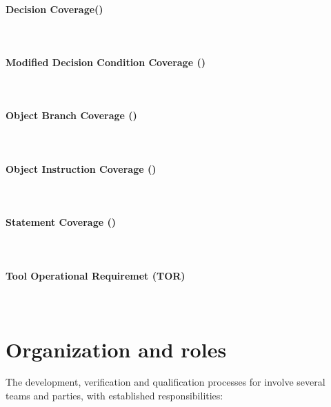\paragraph*{Decision Coverage(\dc)} \ \\

\paragraph*{Modified Decision Condition Coverage (\mcdc)} \ \\

\paragraph*{Object Branch Coverage (\obc)} \ \\

\paragraph*{Object Instruction Coverage (\oic)} \ \\

\paragraph*{Statement Coverage (\stc)} \ \\

\paragraph*{Tool Operational Requiremet (TOR)} \ \\

\section{Organization and roles}

The development, verification and qualification processes for \xcov{} involve
several teams and parties, with established responsibilities:

